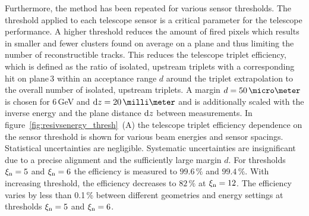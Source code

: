 Furthermore, the method has been repeated for various sensor thresholds.
The threshold applied to each telescope sensor is a critical parameter for the telescope performance.
A higher threshold reduces the amount of fired pixels which results in smaller and fewer clusters found on average on a plane and thus limiting the number of reconstructible tracks.
This reduces the telescope triplet efficiency, which is defined as the ratio of isolated, upstream triplets with a corresponding hit on plane\,3 within an acceptance range $d$
 around the triplet extrapolation to the overall number of isolated, upstream triplets.
A margin $d = 50\,\micro\meter$ is chosen for 6\,GeV and $\dz = 20\,\milli\meter$ and is additionally scaled with the inverse energy and the plane distance $\textrm{d}z$ between measurements. 
In figure~\ref{fig:resivsenergy_thresh}~(A) the telescope triplet efficiency dependence on the sensor threshold is shown for various beam energies and sensor spacings.
Statistical uncertainties are negligible.
Systematic uncertainties are insignificant due to a precise alignment and the sufficiently large margin $d$.  
For thresholds $\xi_{\textrm{n}} = 5$ and $\xi_{\textrm{n}} = 6$ the efficiency is measured to $99.6\,\%$ and $99.4\,\%$.
With increasing threshold, the efficiency decreases to $82\,\%$ at $\xi_{\textrm{n}} = 12$. 
The efficiency varies by less than 0.1\,\% between different geometries and energy settings at thresholds $\xi_{\textrm{n}} = 5$ and $\xi_{\textrm{n}} = 6$. 

